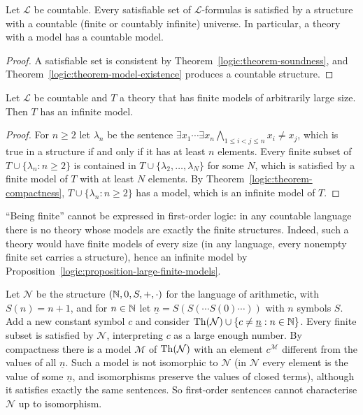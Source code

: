 \begin{theorem}\label{logic:theorem-lowenheim-skolem}
Let $\mathcal{L}$ be countable. Every satisfiable set of $\mathcal{L}$-formulas
is satisfied by a structure with a countable (finite or countably infinite)
universe. In particular, a theory with a model has a countable model.
\end{theorem}

\begin{proof}
A satisfiable set is consistent by Theorem~\ref{logic:theorem-soundness}, and
Theorem~\ref{logic:theorem-model-existence} produces a countable structure.
\end{proof}

\begin{proposition}\label{logic:proposition-large-finite-models}
Let $\mathcal{L}$ be countable and $T$ a theory that has finite models of
arbitrarily large size. Then $T$ has an infinite model.
\end{proposition}

\begin{proof}
For $n \geq 2$ let $\lambda_n$ be the sentence
$\exists x_1 \cdots \exists x_n \bigwedge_{1 \leq i < j \leq n} x_i \neq x_j$, which
is true in a structure if and only if it has at least $n$ elements. Every
finite subset of $T \cup \{\lambda_n : n \geq 2\}$ is contained in
$T \cup \{\lambda_2, \ldots, \lambda_N\}$ for some $N$, which is satisfied by a
finite model of $T$ with at least $N$ elements. By
Theorem~\ref{logic:theorem-compactness}, $T \cup \{\lambda_n : n \geq 2\}$ has a
model, which is an infinite model of $T$.
\end{proof}

\begin{counterexample}\label{logic:counterexample-finiteness}
``Being finite'' cannot be expressed in first-order logic: in any countable
language there is no theory whose models are exactly the finite structures.
Indeed, such a theory would have finite models of every size (in any
language, every nonempty finite set carries a structure), hence an infinite
model by Proposition~\ref{logic:proposition-large-finite-models}.
\end{counterexample}

\begin{example}\label{logic:example-nonstandard-arithmetic}
Let $\mathcal{N}$ be the structure $(\mathbb{N}, 0, S, +, \cdot)$ for the language of
arithmetic, with $S(n) = n + 1$, and for $n \in \mathbb{N}$ let
$\underline{n} = S(S(\cdots S(0)\cdots))$ with $n$ symbols $S$. Add a new constant
symbol $c$ and consider
$\operatorname{Th}(\mathcal{N}) \cup \{c \neq \underline{n} : n \in \mathbb{N}\}$. Every finite subset
is satisfied by $\mathcal{N}$, interpreting $c$ as a large enough number. By
compactness there is a model $\mathcal{M}$ of $\operatorname{Th}(\mathcal{N})$ with an
element $c^{\mathcal{M}}$ different from the values of all
$\underline{n}$. Such a model is not isomorphic to $\mathcal{N}$ (in
$\mathcal{N}$ every element is the value of some $\underline{n}$, and
isomorphisms preserve the values of closed terms), although it satisfies
exactly the same sentences. So first-order sentences cannot characterise
$\mathcal{N}$ up to isomorphism.
\end{example}

